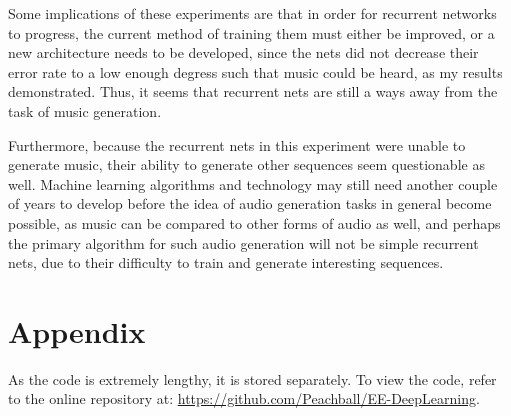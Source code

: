 \documentclass[12pt, titlepage]{article}
\begin{document}
Some implications of these experiments are that in order for recurrent networks
to progress, the current method of training them must either be improved, or
a new architecture needs to be developed, since the nets did not decrease their
error rate to a low enough degress such that music could be heard, as my results
demonstrated. Thus, it seems that recurrent nets are still a ways away from the
task of music generation.

Furthermore, because the recurrent nets in this experiment were unable to
generate music, their ability to generate other sequences seem questionable as
well. Machine learning algorithms and technology may still need another couple
of years to develop before the idea of audio generation tasks in general become
possible, as music can be compared to other forms of audio as well, and perhaps
the primary algorithm for such audio generation will not be simple recurrent
nets, due to their difficulty to train and generate interesting sequences.

\section{Appendix}
As the code is extremely lengthy, it is stored separately. To view the code,
refer to the online repository at: \url{https://github.com/Peachball/EE-DeepLearning}.
\end{document}
